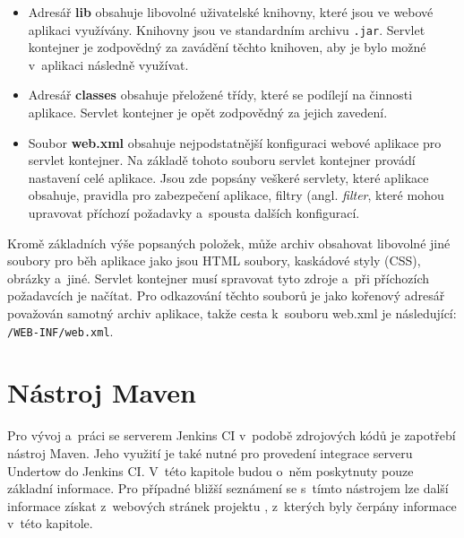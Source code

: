             \begin{itemize}
                \item Adresář \textbf{lib} obsahuje libovolné uživatelské knihovny, které jsou ve webové aplikaci využívány. 
                    Knihovny jsou ve standardním archivu \texttt{.jar}.
                    Servlet kontejner je zodpovědný za zavádění těchto knihoven, aby je bylo možné v~aplikaci následně využívat.

                \item Adresář \textbf{classes} obsahuje přeložené třídy, které se podílejí na činnosti aplikace. 
                    Servlet kontejner je opět zodpovědný za jejich zavedení. 

                \item Soubor \textbf{web.xml} obsahuje nejpodstatnější konfiguraci webové aplikace pro servlet kontejner.
                    Na základě tohoto souboru servlet kontejner provádí nastavení celé aplikace.
                    Jsou zde popsány veškeré servlety, které aplikace obsahuje, pravidla pro zabezpečení aplikace,
                    filtry (angl. \emph{filter}, které mohou upravovat příchozí požadavky a~spousta dalších konfigurací. 
            \end{itemize}

            Kromě základních výše popsaných položek, může archiv obsahovat libovolné jiné soubory pro běh aplikace jako jsou 
            HTML soubory, kaskádové styly (CSS), obrázky a~jiné. Servlet kontejner musí spravovat tyto zdroje
            a~při příchozích požadavcích je načítat. Pro odkazování těchto souborů je jako kořenový adresář považován
            samotný archiv aplikace, takže cesta k~souboru web.xml je následující: \texttt{/WEB-INF/web.xml}.

            
         
    \section{Nástroj Maven} \label{maven}
        Pro vývoj a~práci se serverem Jenkins CI v~podobě zdrojových kódů je zapotřebí nástroj Maven. 
        Jeho využití je také nutné pro provedení integrace serveru Undertow do Jenkins CI. 
        V~této kapitole budou o~něm poskytnuty pouze základní informace. Pro případné bližší
        seznámení se s~tímto nástrojem lze další informace získat z~webových stránek projektu \cite{mavenWeb},
        z~kterých byly čerpány informace v~této kapitole. 
        

